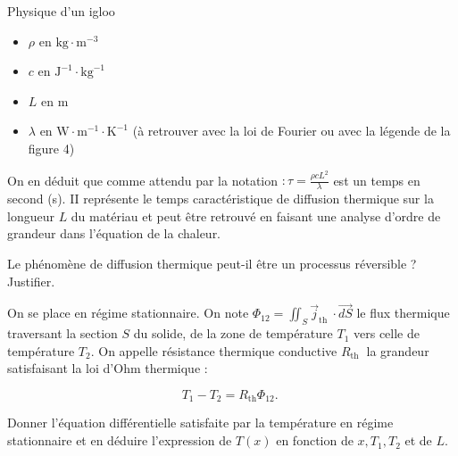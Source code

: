 \begin{exo}[PC][1][devoir]{Physique d'un igloo}
\begin{quest}
{\begin{itemize}
  \item $\rho$ en $\mathrm{kg} \cdot \mathrm{m}^{-3}$

  \item $c$ en $\mathrm{J}^{-1} \cdot \mathrm{kg}^{-1}$

  \item $L$ en $\mathrm{m}$

  \item $\lambda$ en $\mathrm{W} \cdot \mathrm{m}^{-1} \cdot \mathrm{K}^{-1}$ (à retrouver avec la loi de Fourier ou avec la légende de la figure 4)

\end{itemize}

On en déduit que comme attendu par la notation $: \tau=\frac{\rho c L^{2}}{\lambda}$ est un temps en second (s). II représente le temps caractéristique de diffusion thermique sur la longueur $L$ du matériau et peut être retrouvé en faisant une analyse d'ordre de grandeur dans l'équation de la chaleur.
}
\item Le phénomène de diffusion thermique peut-il être un processus réversible ? Justifier.

\end{quest}

On se place en régime stationnaire. On note $\Phi_{12}=\iint_{S} \vec{j}_{\text {th }} \cdot \overrightarrow{d S}$ le flux thermique traversant la section $S$ du solide, de la zone de température $T_{1}$ vers celle de température $T_{2}$. On appelle résistance thermique conductive $R_{\text {th }}$ la grandeur satisfaisant la loi d'Ohm thermique :

$$
T_{1}-T_{2}=R_{\mathrm{th}} \Phi_{12} \text {. }
$$

\begin{quest}
\item Donner l'équation différentielle satisfaite par la température en régime stationnaire et en déduire l'expression de $T(x)$ en fonction de $x, T_{1}, T_{2}$ et de $L$.

\end{quest}
\end{exo}
